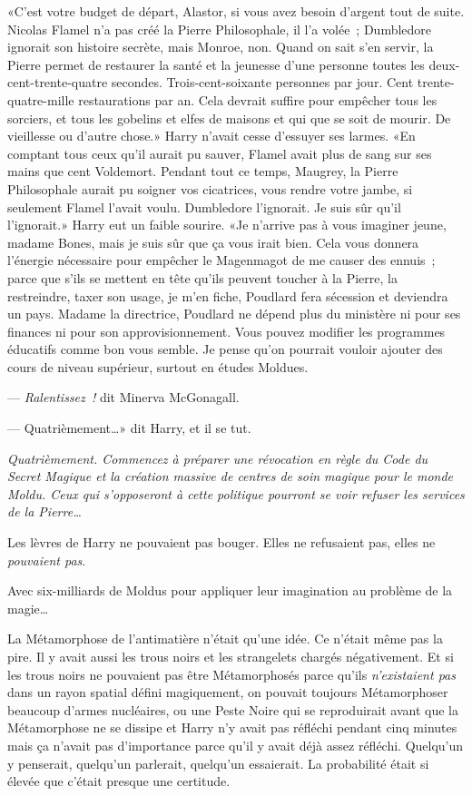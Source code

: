 «C'est votre budget de départ, Alastor, si vous avez besoin d'argent tout de suite. Nicolas Flamel n'a pas créé la Pierre Philosophale, il l'a volée~; Dumbledore ignorait son histoire secrète, mais Monroe, non. Quand on sait s'en servir, la Pierre permet de restaurer la santé et la jeunesse d'une personne toutes les deux-cent-trente-quatre secondes. Trois-cent-soixante personnes par jour. Cent trente-quatre-mille restaurations par an. Cela devrait suffire pour empêcher tous les sorciers, et tous les gobelins et elfes de maisons et qui que se soit de mourir. De vieillesse ou d'autre chose.» Harry n'avait cesse d'essuyer ses larmes. «En comptant tous ceux qu'il aurait pu sauver, Flamel avait plus de sang sur ses mains que cent Voldemort. Pendant tout ce temps, Maugrey, la Pierre Philosophale aurait pu soigner vos cicatrices, vous rendre votre jambe, si seulement Flamel l'avait voulu. Dumbledore l'ignorait. Je suis sûr qu'il l'ignorait.» Harry eut un faible sourire. «Je n'arrive pas à vous imaginer jeune, madame Bones, mais je suis sûr que ça vous irait bien. Cela vous donnera l'énergie nécessaire pour empêcher le Magenmagot de me causer des ennuis~; parce que s'ils se mettent en tête qu'ils peuvent toucher à la Pierre, la restreindre, taxer son usage, je m'en fiche, Poudlard fera sécession et deviendra un pays. Madame la directrice, Poudlard ne dépend plus du ministère ni pour ses finances ni pour son approvisionnement. Vous pouvez modifier les programmes éducatifs comme bon vous semble. Je pense qu'on pourrait vouloir ajouter des cours de niveau supérieur, surtout en études Moldues.

--- \emph{Ralentissez~!} dit Minerva McGonagall.

--- Quatrièmement…» dit Harry, et il se tut.

\emph{Quatrièmement. Commencez à préparer une révocation en règle du Code du Secret Magique et la création massive de centres de soin magique pour le monde Moldu. Ceux qui s'opposeront à cette politique pourront se voir refuser les services de la Pierre…}

Les lèvres de Harry ne pouvaient pas bouger. Elles ne refusaient pas, elles ne \emph{pouvaient pas}.

Avec six-milliards de Moldus pour appliquer leur imagination au problème de la magie…

La Métamorphose de l'antimatière n'était qu'une idée. Ce n'était même pas la pire. Il y avait aussi les trous noirs et les strangelets chargés négativement. Et si les trous noirs ne pouvaient pas être Métamorphosés parce qu'ils \emph{n'existaient pas} dans un rayon spatial défini magiquement, on pouvait toujours Métamorphoser beaucoup d'armes nucléaires, ou une Peste Noire qui se reproduirait avant que la Métamorphose ne se dissipe et Harry n'y avait pas réfléchi pendant cinq minutes mais ça n'avait pas d'importance parce qu'il y avait déjà assez réfléchi. Quelqu'un y penserait, quelqu'un parlerait, quelqu'un essaierait. La probabilité était si élevée que c'était presque une certitude.

